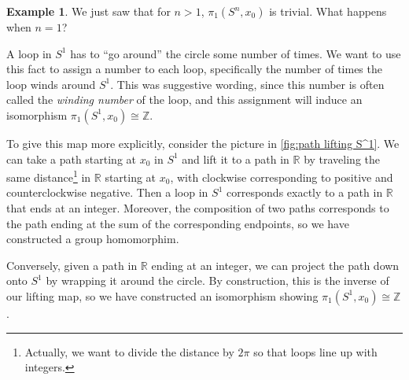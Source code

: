 \documentclass{article}
\theoremstyle{definition}
\newtheorem{exa}[thm]{Example}
\theoremstyle{remark}
\newcommand{\Z}{\mathbb Z}
\newcommand{\R}{\mathbb R}
\numberwithin{figure}{section}
\begin{document}
\begin{exa}
	We just saw that for $n > 1$, $\pi_1(S^n, x_0)$ is trivial. What happens when $n = 1$?
	
	A loop in $S^1$ has to ``go around'' the circle some number of times. We want to use this fact to assign a number to each loop, specifically the number of times the loop winds around $S^1$. This was suggestive wording, since this number is often called the \emph{winding number} of the loop, and this assignment will induce an isomorphism $\pi_1(S^1, x_0) \cong \Z$.
	
	To give this map more explicitly, consider the picture in \cref{fig:path lifting S^1}. We can take a path starting at $x_0$ in $S^1$ and lift it to a path in $\R$ by traveling the same distance\footnote{Actually, we want to divide the distance by $2\pi$ so that loops line up with integers.} in $\R$ starting at $x_0$, with clockwise corresponding to positive and counterclockwise negative. Then a loop in $S^1$ corresponds exactly to a path in $\R$ that ends at an integer. Moreover, the composition of two paths corresponds to the path ending at the sum of the corresponding endpoints, so we have constructed a group homomorphim.
	
	Conversely, given a path in $\R$ ending at an integer, we can project the path down onto $S^1$ by wrapping it around the circle. By construction, this is the inverse of our lifting map, so we have constructed an isomorphism showing $\pi_1(S^1, x_0) \cong \Z$.
	
	\begin{figure}[h]
		\centering
\end{figure}
\end{exa}
\end{document}
